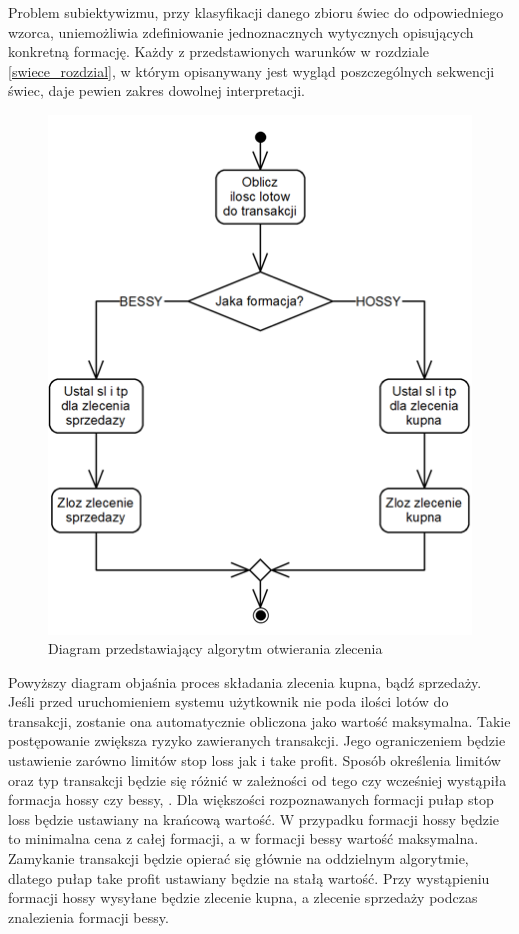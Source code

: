 \documentclass[pdflatex,11pt]{aghdpl}
\begin{document}
Problem subiektywizmu, przy klasyfikacji danego zbioru świec do odpowiedniego wzorca, uniemożliwia zdefiniowanie jednoznacznych wytycznych opisujących konkretną formację. Każdy z przedstawionych warunków w rozdziale \ref{swiece_rozdzial}, w którym opisanywany jest wygląd poszczególnych sekwencji świec, daje pewien zakres dowolnej interpretacji. 

\begin{figure}[H]
\begin{center}
\includegraphics[width=12cm]{otwarcie.png}
\caption{Diagram przedstawiający algorytm otwierania zlecenia}
\label{otwarcie}
\end{center}
\end{figure} 

Powyższy diagram objaśnia proces składania zlecenia kupna, bądź sprzedaży. Jeśli przed uruchomieniem systemu użytkownik nie poda ilości lotów do transakcji, zostanie ona automatycznie obliczona jako wartość maksymalna. Takie postępowanie zwiększa ryzyko zawieranych transakcji. Jego ograniczeniem będzie ustawienie zarówno limitów stop loss jak i take profit. Sposób określenia limitów oraz typ transakcji będzie się różnić w zależności od tego czy wcześniej wystąpiła formacja hossy czy bessy, . Dla większości rozpoznawanych formacji pułap stop loss będzie ustawiany na krańcową wartość. W przypadku formacji hossy będzie to minimalna cena z całej formacji, a w formacji bessy wartość maksymalna. Zamykanie transakcji będzie opierać się głównie na oddzielnym algorytmie, dlatego pułap take profit ustawiany będzie na stałą wartość. Przy wystąpieniu formacji hossy wysyłane będzie zlecenie kupna, a zlecenie sprzedaży podczas znalezienia formacji bessy. 
\end{document}
